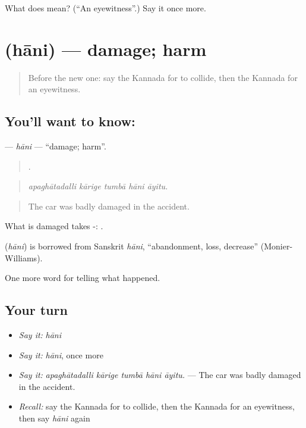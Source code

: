 \begin{tcolorbox}[breakable,colback=teal!4,colframe=teal!35!black,title={Before you move on}]
What does  mean? (\textquotedblleft{}An eyewitness\textquotedblright{}.) Say it once more.
\end{tcolorbox}
\section[\texorpdfstring{\kn{ಹಾನಿ} (hāni)}{ಹಾನಿ (hāni)}]{ (hāni) — damage; harm}

\label{lesson:KA-C330-hani}



\begin{quote}
Before the new one: say the Kannada for to collide, then the Kannada for an eyewitness.
\end{quote}

\subsection*{You'll want to know: }
\textbf{} — \emph{hāni} — \textquotedblleft{}damage; harm\textquotedblright{}.

\begin{quote}
    .
\end{quote}

\begin{quote}
\emph{apaghātadalli kārige tumbā hāni āyitu.}
\end{quote}

\begin{quote}
The car was badly damaged in the accident.
\end{quote}

What is damaged takes -:   .

\begin{cousinweb}
\textbf{} (\emph{hāni}) is borrowed from Sanskrit \emph{hāni}, \textquotedblleft{}abandonment, loss, decrease\textquotedblright{} (Monier-Williams).
\end{cousinweb}

\begin{grammarlens}[title={What you've built}]
One more word for telling what happened.
\end{grammarlens}

\subsection*{Your turn}
\begin{itemize}
\raggedright
  \item \emph{Say it:} \emph{hāni}
  \item \emph{Say it:} \emph{hāni}, once more
  \item \emph{Say it:} \emph{apaghātadalli kārige tumbā hāni āyitu.} — The car was badly damaged in the accident.
  \item \emph{Recall:} say the Kannada for to collide, then the Kannada for an eyewitness, then say \emph{hāni} again
\end{itemize}

